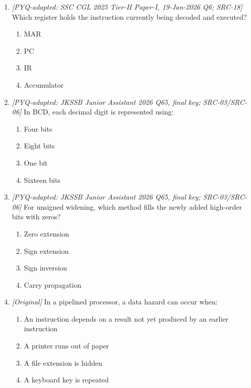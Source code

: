 \begin{enumerate}[label=\textbf{Q\arabic*.}, leftmargin=*]
\begin{enumerate}[label=\Alph*.]
    \item CISC instructions can complete complex tasks in fewer lines.
    \item ARM designs follow RISC ideas.
    \item CISC processors contain no control unit.
  \end{enumerate}
\item \textit{[PYQ-adapted: SSC CGL 2025 Tier-II Paper-I, 19-Jan-2026 Q6; SRC-18]} Which register holds the instruction currently being decoded and executed?
  \begin{enumerate}[label=\Alph*.]
\item MAR
   \item PC
   \item IR
   \item Accumulator
  \end{enumerate}

\item \textit{[PYQ-adapted: JKSSB Junior Assistant 2026 Q65, final key; SRC-03/SRC-06]} In BCD, each decimal digit is represented using:
  \begin{enumerate}[label=\Alph*.]
\item Four bits
   \item Eight bits
   \item One bit
   \item Sixteen bits
  \end{enumerate}

\item \textit{[PYQ-adapted: JKSSB Junior Assistant 2026 Q65, final key; SRC-03/SRC-06]} For unsigned widening, which method fills the newly added high-order bits with zeros?
  \begin{enumerate}[label=\Alph*.]
\item Zero extension
   \item Sign extension
   \item Sign inversion
   \item Carry propagation
  \end{enumerate}

\item \textit{[Original]} In a pipelined processor, a data hazard can occur when:
  \begin{enumerate}[label=\Alph*.]
\item An instruction depends on a result not yet produced by an earlier instruction
   \item A printer runs out of paper
   \item A file extension is hidden
   \item A keyboard key is repeated
  \end{enumerate}


\end{enumerate}
